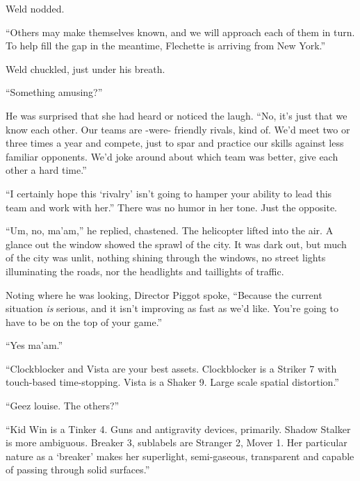 Weld nodded.



``Others may make themselves known, and we will approach each of them in turn.  To help fill the gap in the meantime, Flechette is arriving from New York.''



Weld chuckled, just under his breath.



``Something amusing?''



He was surprised that she had heard or noticed the laugh.  ``No, it's just that we know each other.  Our teams are -were- friendly rivals, kind of.  We'd meet two or three times a year and compete, just to spar and practice our skills against less familiar opponents.  We'd joke around about which team was better, give each other a hard time.''



``I certainly hope this `rivalry' isn't going to hamper your ability to lead this team and work with her.''  There was no humor in her tone.  Just the opposite.



``Um, no, ma'am,'' he replied, chastened.  The helicopter lifted into the air.  A glance out the window showed the sprawl of the city.  It was dark out, but much of the city was unlit, nothing shining through the windows, no street lights illuminating the roads, nor the headlights and taillights of traffic.



Noting where he was looking, Director Piggot spoke, ``Because the current situation \emph{is} serious, and it isn't improving as fast as we'd like.  You're going to have to be on the top of your game.''



``Yes ma'am.''



``Clockblocker and Vista are your best assets.  Clockblocker is a Striker 7 with touch-based time-stopping.  Vista is a Shaker 9.  Large scale spatial distortion.''



``Geez louise.  The others?''



``Kid Win is a Tinker 4.  Guns and antigravity devices, primarily.  Shadow Stalker is more ambiguous.  Breaker 3, sublabels are Stranger 2, Mover 1.  Her particular nature as a `breaker' makes her superlight, semi-gaseous, transparent and capable of passing through solid surfaces.''



